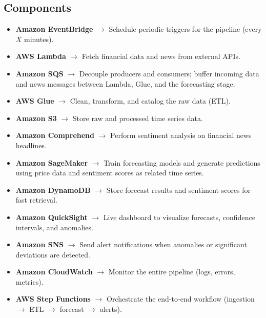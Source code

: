 \documentclass[a4paper,12pt]{article}
\begin{document}
\subsection{Components}
\begin{itemize}[leftmargin=1.2em]
    \item \textbf{Amazon EventBridge} $\rightarrow$ Schedule periodic triggers for the pipeline (every $X$ minutes).
    \item \textbf{AWS Lambda} $\rightarrow$ Fetch financial data and news from external APIs.
    \item \textbf{Amazon SQS} $\rightarrow$ Decouple producers and consumers; buffer incoming data and news messages between Lambda, Glue, and the forecasting stage.
    \item \textbf{AWS Glue} $\rightarrow$ Clean, transform, and catalog the raw data (ETL).
    \item \textbf{Amazon S3} $\rightarrow$ Store raw and processed time series data.
    \item \textbf{Amazon Comprehend} $\rightarrow$ Perform sentiment analysis on financial news headlines.
    \item \textbf{Amazon SageMaker} $\rightarrow$ Train forecasting models and generate predictions using price data and sentiment scores as related time series.
    \item \textbf{Amazon DynamoDB} $\rightarrow$ Store forecast results and sentiment scores for fast retrieval.
    \item \textbf{Amazon QuickSight} $\rightarrow$ Live dashboard to visualize forecasts, confidence intervals, and anomalies.
    \item \textbf{Amazon SNS} $\rightarrow$ Send alert notifications when anomalies or significant deviations are detected.
    \item \textbf{Amazon CloudWatch} $\rightarrow$ Monitor the entire pipeline (logs, errors, metrics).
    \item \textbf{AWS Step Functions} $\rightarrow$ Orchestrate the end-to-end workflow (ingestion $\rightarrow$ ETL $\rightarrow$ forecast $\rightarrow$ alerts).
\end{itemize}
\end{document}
